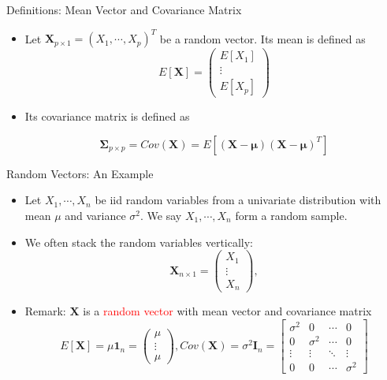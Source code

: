 \documentclass[
  ignorenonframetext,
]{beamer}
\providecommand{\tightlist}{%
  \setlength{\itemsep}{0pt}\setlength{\parskip}{0pt}}
\begin{document}
\begin{frame}{Definitions: Mean Vector and Covariance Matrix}
\protect\hypertarget{definitions-mean-vector-and-covariance-matrix}{}
\begin{itemize}
\item
  Let \(\mathbf X_{p\times 1}=(X_1, \cdots, X_p)^T\) be a random vector.
  Its mean is defined as \[E[\mathbf X]=\begin{pmatrix}
  E[X_1]\\ \vdots \\ E[X_p]
  \end{pmatrix}\]
\item
  Its covariance matrix is defined as

  \[\boldsymbol \Sigma_{p\times p} = Cov(\mathbf X) = E[(\mathbf X -\boldsymbol \mu)(\mathbf X - \boldsymbol \mu)^T]\]
\end{itemize}
\end{frame}

\begin{frame}{Random Vectors: An Example}
\protect\hypertarget{random-vectors-an-example}{}
\begin{itemize}
\tightlist
\item
  Let \(X_1, \cdots, X_n\) be iid random variables from a univariate
  distribution with mean \(\mu\) and variance \(\sigma^2\). We say
  \(X_1, \cdots, X_n\) form a random sample.
\item
  We often stack the random variables vertically:
  \[\mathbf X_{n\times 1}=\begin{pmatrix}
  X_1 \\ \vdots \\ X_n\end{pmatrix},\]
\item
  Remark: \(\mathbf X\) is a \textcolor{red}{random vector} with mean
  vector and covariance matrix
  \[E[\mathbf X]=\mu \mathbf 1_n =\begin{pmatrix}\mu \\ \vdots \\ \mu\end{pmatrix},
  Cov(\mathbf X)=\sigma^2 \mathbf I_n = \begin{bmatrix} 
  \sigma^2 & 0 & \cdots & 0 \\ 
  0 & \sigma^2 & \cdots & 0 \\
  \vdots & \vdots & \ddots & \vdots \\ 
  0 & 0 & \cdots & \sigma^2 
  \end{bmatrix}
  \]
\end{itemize}
\end{frame}
\end{document}
